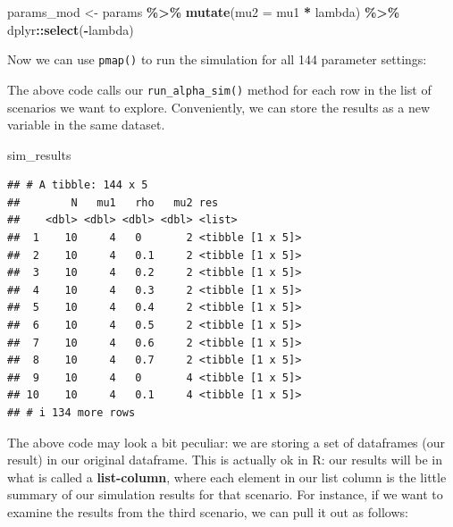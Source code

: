 \documentclass[
]{book}
\newenvironment{Shaded}{\begin{snugshade}}{\end{snugshade}}
\newcommand{\AttributeTok}[1]{\textcolor[rgb]{0.13,0.29,0.53}{#1}}
\newcommand{\DecValTok}[1]{\textcolor[rgb]{0.00,0.00,0.81}{#1}}
\newcommand{\FunctionTok}[1]{\textcolor[rgb]{0.13,0.29,0.53}{\textbf{#1}}}
\newcommand{\NormalTok}[1]{#1}
\newcommand{\OtherTok}[1]{\textcolor[rgb]{0.56,0.35,0.01}{#1}}
\newcommand{\SpecialCharTok}[1]{\textcolor[rgb]{0.81,0.36,0.00}{\textbf{#1}}}
\begin{document}
\begin{Shaded}
\begin{Highlighting}[]
\NormalTok{params\_mod }\OtherTok{\textless{}{-}} 
\NormalTok{  params }\SpecialCharTok{\%\textgreater{}\%}
  \FunctionTok{mutate}\NormalTok{(}\AttributeTok{mu2 =}\NormalTok{ mu1 }\SpecialCharTok{*}\NormalTok{ lambda) }\SpecialCharTok{\%\textgreater{}\%}
\NormalTok{  dplyr}\SpecialCharTok{::}\FunctionTok{select}\NormalTok{(}\SpecialCharTok{{-}}\NormalTok{lambda)}
\end{Highlighting}
\end{Shaded}

Now we can use \texttt{pmap()} to run the simulation for all 144 parameter settings:

\begin{Shaded}
\end{Shaded}

The above code calls our \texttt{run\_alpha\_sim()} method for each row in the list of scenarios we want to explore.
Conveniently, we can store the results as a new variable in the same dataset.

\begin{Shaded}
\begin{Highlighting}[]
\NormalTok{sim\_results}
\end{Highlighting}
\end{Shaded}

\begin{verbatim}
## # A tibble: 144 x 5
##        N   mu1   rho   mu2 res             
##    <dbl> <dbl> <dbl> <dbl> <list>          
##  1    10     4   0       2 <tibble [1 x 5]>
##  2    10     4   0.1     2 <tibble [1 x 5]>
##  3    10     4   0.2     2 <tibble [1 x 5]>
##  4    10     4   0.3     2 <tibble [1 x 5]>
##  5    10     4   0.4     2 <tibble [1 x 5]>
##  6    10     4   0.5     2 <tibble [1 x 5]>
##  7    10     4   0.6     2 <tibble [1 x 5]>
##  8    10     4   0.7     2 <tibble [1 x 5]>
##  9    10     4   0       4 <tibble [1 x 5]>
## 10    10     4   0.1     4 <tibble [1 x 5]>
## # i 134 more rows
\end{verbatim}

The above code may look a bit peculiar: we are storing a set of dataframes (our result) in our original dataframe.
This is actually ok in R: our results will be in what is called a \textbf{list-column}, where each element in our list column is the little summary of our simulation results for that scenario.
For instance, if we want to examine the results from the third scenario, we can pull it out as follows:
\end{document}
